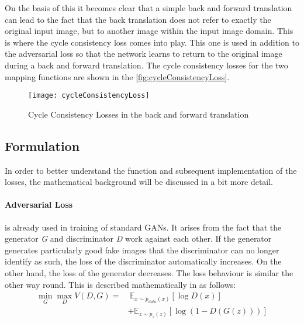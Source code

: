 \documentclass[fleqn,10pt]{SelfArx} %
\begin{document}
On the basis of this it becomes clear that a simple back and forward translation can lead to the fact that the back translation does not refer to exactly the original input image, but to another image within the input image domain. This is where the cycle consistency loss comes into play. This one is used in addition to the adversarial loss so that the network learns to return to the original image during a back and forward translation. The cycle consistency losses for the two mapping functions are shown in the \autoref{fig:cycleConsistencyLoss}.~\cite{image-to-image-ccan}

\begin{figure*}[htb] \centering 
	\texttt{[image: cycleConsistencyLoss]}
	\caption{Cycle Consistency Losses in the back and forward translation~\cite{image-to-image-ccan}}
	\label{fig:cycleConsistencyLoss}
\end{figure*}


\subsection{Formulation}
In order to better understand the function and subsequent implementation of the losses, the mathematical background will be discussed in a bit more detail.

\paragraph{Adversarial Loss} is already used in training of standard \ac{GAN}s. It arises from the fact that the generator \textit{G} and discriminator \textit{D} work against each other. If the generator generates particularly good fake images that the discriminator can no longer identify as such, the loss of the discriminator automatically increases. On the other hand, the loss of the generator decreases. The loss behaviour is similar the other way round. This is described mathematically in \cite{Source-GAN} as follows:
\begin{equation*}
\begin{split}
\min_{G} \max_{D} V(D,G) =&~\mathbb E_{x \sim p_{data}(x)} [\log D(x)] \\\
&+ \mathbb E_{z \sim p_{z}(z)} [\log (1-D(G(z)))]
\end{split}
\end{equation*}
\end{document}
